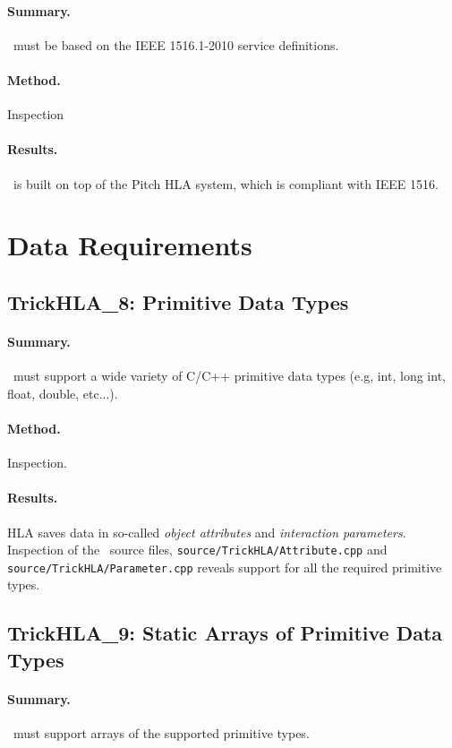\paragraph{Summary.}
\TrickHLA\ must be based on the IEEE 1516.1-2010 service definitions.
\paragraph{Method.} Inspection
\paragraph{Results.}
\TrickHLA\ is built on top of the Pitch HLA system,
which is compliant with IEEE 1516.



\section{Data Requirements}

\subsection{TrickHLA\_8: Primitive Data Types}
\paragraph{Summary.}
\TrickHLA\ must support a wide variety of C/C++ primitive data types
(e.g, int, long int, float, double, etc...).
\paragraph{Method.} Inspection.
\paragraph{Results.}
HLA saves data in so-called {\em object attributes} and
{\em interaction parameters}.
Inspection of the \TrickHLA\ source files,
{\tt source/TrickHLA/Attribute.cpp}
and
{\tt source/TrickHLA/Parameter.cpp}
reveals support for all the required primitive types.

\subsection{TrickHLA\_9: Static Arrays of Primitive Data Types}
\paragraph{Summary.}
\TrickHLA\ must support arrays of the supported primitive types.
